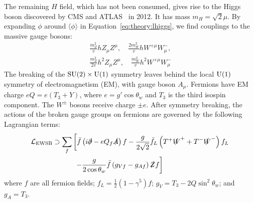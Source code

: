 The remaining ${H}$ field, which has not been consumed, gives rise to the Higgs boson discovered by CMS and ATLAS~\cite{higgsdisc} in 2012.
It has mass ${m_H = \sqrt2\mu}$.
By expanding ${\phi}$ around ${\langle \phi \rangle}$ in Equation~\ref{eq:theory:lhiggs}, we find couplings to the massive gauge bosons:
\begin{gather}
    \frac{m_Z^2}{v} hZ_\mu Z^\mu, \quad \frac{2m_W^2}{v}hW^{+\mu} W^{-}_\mu, \nonumber \\
    \frac{m_Z^2}{2v} h^2 Z_\mu Z^\mu, \quad \frac{m_W^2}{v} h^2 W^{+\mu} W^-_\mu 
\end{gather}
The breaking of the ${\operatorname{\mathrm{SU}}(2)\times \operatorname{\mathrm{U}}(1)}$ symmetry leaves behind the local ${\operatorname{\mathrm{U}}(1)}$ symmetry of electromagnetism (EM), with gauge boson ${A_\mu}$.
Fermions have EM charge ${eQ = e(T_3+Y)}$, where ${e=g'\cos\theta_w}$ and ${T_3}$ is the third isospin component. 
The ${W^\pm}$ bosons receive charge ${\pm e}$.
After symmetry breaking, the actions of the broken gauge groups on fermions are governed by the following Lagrangian terms:
\begin{align}
    \mathcal{L}_\mathrm{EWSB} \supset 
            \sum_f &\left[\bar f\left(i\slashed\partial-eQ_f\slashed A\right) f 
            - \frac{g}{2\sqrt{2}} \bar f_L \left(T^+\slashed W^+ + T^- \slashed W^-\right) f_L\right. \nonumber \\
            &\left.~- \frac{g}{2\cos\theta_w} \bar f\left(g_{Vf} - g_{Af} \right)\slashed Z f \right]
\end{align}
where ${f}$ are all fermion fields; ${f_L = \frac{1}{2}(1-\gamma^5)f}$; ${g_{V} = T_3- 2Q\sin^2\theta_w}$; and ${g_{A} = T_3}$.

